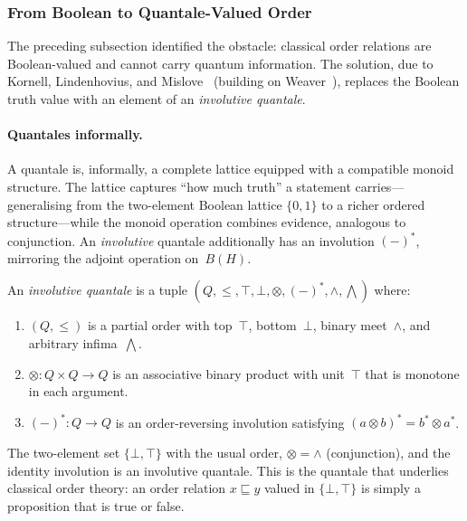 \subsubsection{From Boolean to Quantale-Valued Order}

The preceding subsection identified the obstacle: classical order
relations are Boolean-valued and cannot carry quantum information.
The solution, due to Kornell, Lindenhovius, and
Mislove~\cite{KLM2024} (building on Weaver~\cite{Weaver2010}),
replaces the Boolean truth value with an element of an
\emph{involutive quantale}.

\paragraph{Quantales informally.}
A quantale is, informally, a complete lattice equipped with a
compatible monoid structure.
The lattice captures ``how much truth'' a statement carries---generalising
from the two-element Boolean lattice $\{0, 1\}$ to a richer
ordered structure---while the monoid operation combines evidence,
analogous to conjunction.
An \emph{involutive} quantale additionally has an involution
$(-)^*$, mirroring the adjoint operation on~$B(H)$.

\begin{definition}
\label{def:inv-quantale}
An \emph{involutive quantale} is a tuple
$(Q, \leq, \top, \bot, \otimes, (-)^*, \wedge, \bigwedge)$ where:
\begin{enumerate}
  \item $(Q, \leq)$ is a partial order with top~$\top$,
    bottom~$\bot$, binary meet~$\wedge$, and arbitrary
    infima~$\bigwedge$.
  \item $\otimes : Q \times Q \to Q$ is an associative binary product
    with unit~$\top$ that is monotone in each argument.
  \item $(-)^* : Q \to Q$ is an order-reversing involution
    satisfying $(a \otimes b)^* = b^* \otimes a^*$.
\end{enumerate}
\end{definition}

\begin{example}
\label{ex:boolean-quantale}
The two-element set $\{\bot, \top\}$ with the usual order,
$\otimes = \wedge$ (conjunction), and the identity involution is an
involutive quantale.
This is the quantale that underlies classical order theory: an order
relation $x \sqsubseteq y$ valued in $\{\bot, \top\}$ is simply a
proposition that is true or false.
\end{example}


